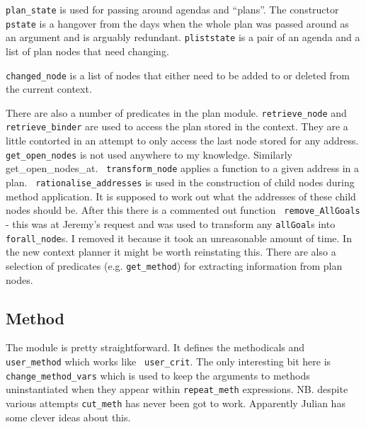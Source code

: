 {\tt plan\_state} is used for passing around agendas and
``plans''.  The constructor {\tt pstate} is a hangover
from the days when the whole plan was passed around as an argument and 
is arguably redundant.  {\tt pliststate} is a pair
of an agenda and a list of plan nodes that need changing.

{\tt changed\_node} is a list of nodes that
either need to be added to or deleted from the current context.  

There are also a number of predicates in the plan module.  {\tt retrieve\_node} and {\tt
  retrieve\_binder} are used to access the
plan stored in the context.  They are a little contorted in an attempt
to only access the last node stored for any address.  {\tt
  get\_open\_nodes} is not used anywhere to my
knowledge.  Similarly
{get\_open\_nodes\_at}.  {\tt
  transform\_node} applies a function to a
given address in a plan.  {\tt
  rationalise\_addresses} is used in the
construction of child nodes during method application.  It is supposed
to work out what the addresses of these child nodes should be.  After
this there is a commented out function {\tt
  remove\_AllGoals} - this was at Jeremy's
request and was used to transform any {\tt allGoal}s
into {\tt forall\_node}s.  I removed it because it took an
unreasonable amount of time.  In the new context planner it might be
worth reinstating this.  There are also a selection of predicates
(e.g. {\tt get\_method}) for extracting information
from plan nodes.

\subsection{Method}
The module is pretty straightforward.  It defines the
methodicals and {\tt
  user\_method} which works like {\tt
  user\_crit}.  The only interesting bit here is
{\tt change\_method\_vars} which is used
to keep the arguments to methods uninstantiated when they appear
within {\tt repeat\_meth} expressions.  NB.
despite various attempts {\tt cut\_meth} has never
been got to work.  Apparently Julian has some clever ideas about this.

